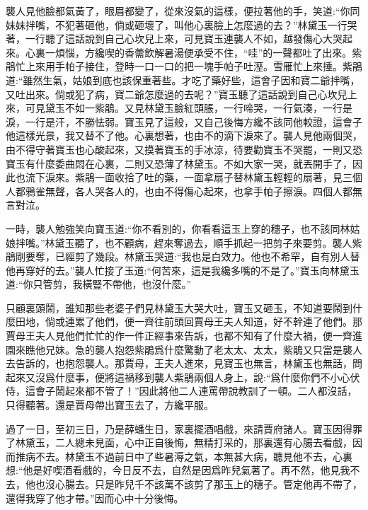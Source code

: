 \begin{parag}
    襲人見他臉都氣黃了，眼眉都變了，從來沒氣的這樣，便拉著他的手，笑道:“你同妹妹拌嘴，不犯著砸他，倘或砸壞了，叫他心裏臉上怎麼過的去？”林黛玉一行哭著，一行聽了這話說到自己心坎兒上來，可見寶玉連襲人不如，越發傷心大哭起來。心裏一煩惱，方纔喫的香薷飲解暑湯便承受不住，“哇”的一聲都吐了出來。紫鵑忙上來用手帕子接住，登時一口一口的把一塊手帕子吐溼。雪雁忙上來捶。紫鵑道:“雖然生氣，姑娘到底也該保重著些。才吃了藥好些，這會子因和寶二爺拌嘴，又吐出來。倘或犯了病，寶二爺怎麼過的去呢？”寶玉聽了這話說到自己心坎兒上來，可見黛玉不如一紫鵑。又見林黛玉臉紅頭脹，一行啼哭，一行氣湊，一行是淚，一行是汗，不勝怯弱。寶玉見了這般，又自己後悔方纔不該同他較證，這會子他這樣光景，我又替不了他。心裏想著，也由不的滴下淚來了。襲人見他兩個哭，由不得守著寶玉也心酸起來，又摸著寶玉的手冰涼，待要勸寶玉不哭罷，一則又恐寶玉有什麼委曲悶在心裏，二則又恐薄了林黛玉。不如大家一哭，就丟開手了，因此也流下淚來。紫鵑一面收拾了吐的藥，一面拿扇子替林黛玉輕輕的扇著，見三個人都鴉雀無聲，各人哭各人的，也由不得傷心起來，也拿手帕子擦淚。四個人都無言對泣。
\end{parag}


\begin{parag}
    一時，襲人勉強笑向寶玉道:“你不看別的，你看看這玉上穿的穗子，也不該同林姑娘拌嘴。”林黛玉聽了，也不顧病，趕來奪過去，順手抓起一把剪子來要剪。襲人紫鵑剛要奪，已經剪了幾段。林黛玉哭道:“我也是白效力。他也不希罕，自有別人替他再穿好的去。”襲人忙接了玉道:“何苦來，這是我纔多嘴的不是了。”寶玉向林黛玉道:“你只管剪，我橫豎不帶他，也沒什麼。”
\end{parag}


\begin{parag}
    只顧裏頭鬧，誰知那些老婆子們見林黛玉大哭大吐，寶玉又砸玉，不知道要鬧到什麼田地，倘或連累了他們，便一齊往前頭回賈母王夫人知道，好不幹連了他們。那賈母王夫人見他們忙忙的作一件正經事來告訴，也都不知有了什麼大禍，便一齊進園來瞧他兄妹。急的襲人抱怨紫鵑爲什麼驚動了老太太、太太，紫鵑又只當是襲人去告訴的，也抱怨襲人。那賈母，王夫人進來，見寶玉也無言，林黛玉也無話，問起來又沒爲什麼事，便將這禍移到襲人紫鵑兩個人身上，說:“爲什麼你們不小心伏侍，這會子鬧起來都不管了！”因此將他二人連罵帶說教訓了一頓。二人都沒話，只得聽著。還是賈母帶出寶玉去了，方纔平服。
\end{parag}


\begin{parag}
    過了一日，至初三日，乃是薛蟠生日，家裏擺酒唱戲，來請賈府諸人。寶玉因得罪了林黛玉，二人總未見面，心中正自後悔，無精打采的，那裏還有心腸去看戲，因而推病不去。林黛玉不過前日中了些暑溽之氣，本無甚大病，聽見他不去，心裏想:“他是好喫酒看戲的，今日反不去，自然是因爲昨兒氣著了。再不然，他見我不去，他也沒心腸去。只是昨兒千不該萬不該剪了那玉上的穗子。管定他再不帶了，還得我穿了他才帶。”因而心中十分後悔。
\end{parag}



